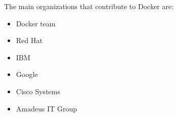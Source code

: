 The main organizations that contribute to Docker are:
\begin{itemize}
    \item Docker team
    \item Red Hat
    \item IBM
    \item Google 
    \item Cisco Systems
    \item Amadeus IT Group
\end{itemize}


